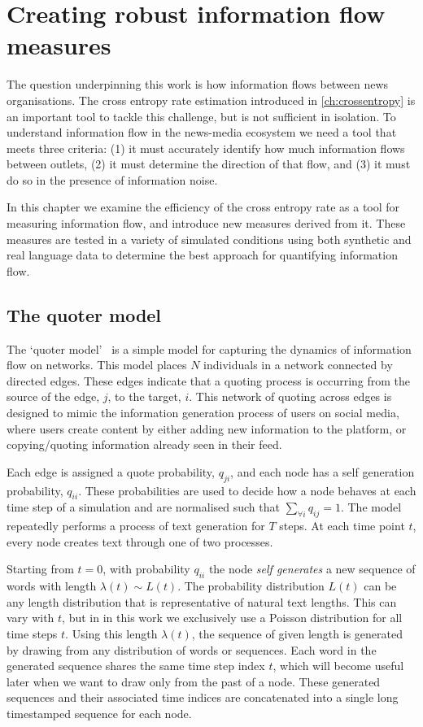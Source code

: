 \chapter{Creating robust information flow measures}\label{ch:quotermodel}

The question underpinning this work is how information flows between news organisations. The cross entropy rate estimation introduced in \autoref{ch:crossentropy} is an important tool to tackle this challenge, but is not sufficient in isolation. To understand information flow in the news-media ecosystem we need a tool that meets three criteria: (1) it must accurately identify how much information flows between outlets, (2) it must determine the direction of that flow, and (3) it must do so in the presence of information noise.

In this chapter we examine the efficiency of the cross entropy rate as a tool for measuring information flow, and introduce new measures derived from it. These measures are tested in a variety of simulated conditions using both synthetic and real language data to determine the best approach for quantifying information flow.


\section{The quoter model}
The `quoter model'~\cite{bagrow_quoter_2018} is a simple model for capturing the dynamics of information flow on networks. This model places $N$ individuals in a network connected by directed edges. These edges indicate that a quoting process is occurring from the source of the edge, $j$, to the target, $i$. This network of quoting across edges is designed to mimic the information generation process of users on social media, where users create content by either adding new information to the platform, or copying/quoting information already seen in their feed.

Each edge is assigned a quote probability, $q_{ji}$, and each node has a self generation probability, $q_{ii}$. These probabilities are used to decide how a node behaves at each time step of a simulation and are normalised such that $\sum_{\forall i} q_{ij} = 1$. The model repeatedly performs a process of text generation for $T$ steps. At each time point $t$, every node creates text through one of two processes.

Starting from $t=0$, with probability $q_{ii}$ the node \emph{self generates} a new sequence of words with length $\lambda(t) \sim L(t)$. The probability distribution $L(t)$ can be any length distribution that is representative of natural text lengths. This can vary with $t$, but in in this work we exclusively use a Poisson distribution for all time steps $t$. Using this length $\lambda(t)$, the sequence of given length is generated by drawing from any distribution of words or sequences.  Each word in the generated sequence shares the same time step index $t$, which will become useful later when we want to draw only from the past of a node. These generated sequences and their associated time indices are concatenated into a single long timestamped sequence for each node.

